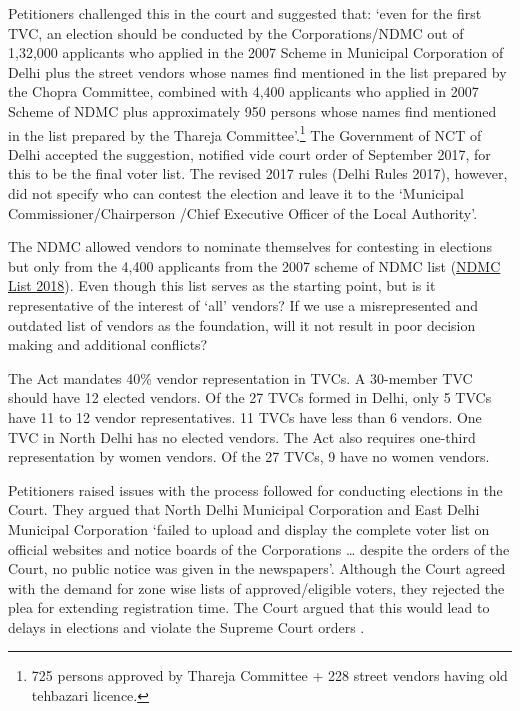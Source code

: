 \documentclass[a4paper, 12pt, twoside]{article}
\begin{document}
{{Petitioners challenged this in the court and suggested that: `even for the first TVC, an election should be conducted by the Corporations/NDMC out of 1,32,000 applicants who applied in the 2007 Scheme in Municipal Corporation of Delhi plus the street vendors whose names find mentioned in the list prepared by the Chopra Committee, combined with 4,400 applicants who applied in 2007 Scheme of NDMC plus approximately 950 persons whose names find mentioned in the list prepared by the Thareja Committee'.\footnote{ 725 persons approved by Thareja Committee + 228 street vendors having old tehbazari licence. 
} The Government of NCT of Delhi accepted the suggestion, notified vide court order of September 2017, for this to be the final voter list. The revised 2017 rules (Delhi Rules 2017), however, did not specify who can contest the election and leave it to the `Municipal Commissioner/Chairperson /Chief Executive Officer of the Local Authority'. 

The NDMC allowed vendors to nominate themselves for contesting in elections but only from the 4,400 applicants from the 2007 scheme of NDMC list (\href{https://ndmc.gov.in/public_notice/TVC\%20election\%20process\%20and\%20nomination.pdf}{NDMC List 2018}). Even though this list serves as the starting point, but is it representative of the interest of ‘all’ vendors? If we use a misrepresented and outdated list of vendors as the foundation, will it not result in poor decision making and additional conflicts?


The Act mandates 40\% vendor representation in TVCs. A 30-member TVC should have 12 elected vendors. Of the 27 TVCs formed in Delhi, only 5 TVCs have 11 to 12 vendor representatives. 11 TVCs have less than 6 vendors. One TVC in North Delhi has no elected vendors. The Act also requires one-third representation by women vendors. Of the 27 TVCs, 9 have no women vendors. 

Petitioners raised issues with the process followed for conducting elections in the Court. They argued that North Delhi Municipal Corporation and East Delhi Municipal Corporation `failed to upload and display the complete voter list on official websites and notice boards of the Corporations … despite the orders of the Court, no public notice was given in the newspapers'. Although the Court agreed with the demand for zone wise lists of approved/eligible voters, they rejected the plea for extending registration time. The Court argued that this would lead to delays in elections and violate the Supreme Court orders \parencite{RPKHU}.

}}
\end{document}
